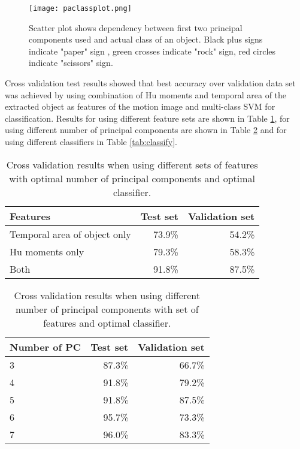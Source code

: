 

\begin{figure}
\begin{center}
\texttt{[image: paclassplot.png]}
\caption{Scatter plot shows dependency between first two principal components used and actual class of an object. Black plus signs indicate "paper" sign , green crosses indicate "rock" sign, red circles indicate "scissors" sign. }
\label{fig:paclassplot}
\end{center}
\end{figure}

Cross validation test results showed that best accuracy over validation data set was achieved by using combination of Hu moments and temporal area of the extracted object as features of the motion image and multi-class SVM for classification. Results for using different feature sets are shown in Table \ref{tab:features}, for using different number of principal components are shown in Table \ref{tab:pca} and for using different classifiers in Table \ref{tab:classify}.

\begin{table}
\begin{center}
\begin{tabular}{| l | r | r |}
\hline
Features & Test set & Validation set \\ \hline
Temporal area of object only & 73.9\% & 54.2\% \\
Hu moments only & 79.3\% & 58.3\% \\
Both & 91.8\% & 87.5\% \\
\hline
\end{tabular}
\end{center}
\caption{Cross validation results when using different sets of features with optimal number of principal components and optimal classifier.}
\label{tab:features}
\end{table}


\begin{table}
\begin{center}
\begin{tabular}{| l | r | r |}
\hline
Number of PC & Test set & Validation set \\ \hline
3 & 87.3\% & 66.7\% \\
4 & 91.8\% & 79.2\% \\
5 & 91.8\% & 87.5\% \\
6 & 95.7\% & 73.3\% \\
7 & 96.0\% & 83.3\% \\
\hline
\end{tabular}
\end{center}
\caption{Cross validation results when using different number of principal components with set of features and optimal classifier.}
\label{tab:pca}
\end{table}

